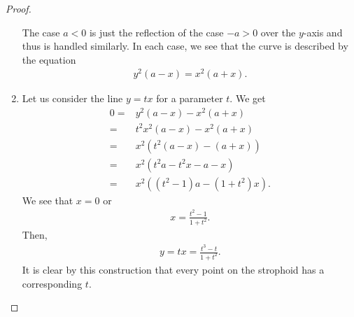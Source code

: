\begin{proof}
\begin{enumerate}
        The case $a<0$ is just the reflection of the case $-a>0$ over the $y$-axis and thus is handled similarly. 
        In each case, we see that the curve is described by the equation
        \begin{align*}
            y^2 (a-x) = x^2 (a+x).
        \end{align*}

        \item Let us consider the line $y=tx$ for a parameter $t$. We get
        \begin{align*}
            0 
            =& y^2 (a-x) - x^2 (a+x)\\
            =& t^2 x^2 (a-x) - x^2 (a+x)\\
            =& x^2 ( t^2(a-x) - (a+x))\\
            =& x^2 (  t^2 a - t^2 x - a - x)\\
            =& x^2 (  (t^2 - 1)a - (1+t^2) x).
        \end{align*}
        We see that $x=0$ or
        \begin{align*}
            x = \frac{t^2 - 1}{1 + t^2}.
        \end{align*}
        Then,
        \begin{align*}
            y = tx = \frac{t^3 - t}{1 + t^2}.
        \end{align*}
        It is clear by this construction that every point on the strophoid has a corresponding $t$.
    \end{enumerate}
\end{proof}

